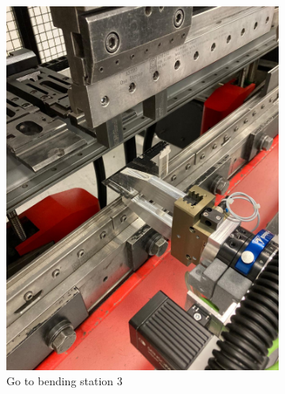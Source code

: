\begin{figure}[h]
    \centering
    \begin{subfigure}[b]{0.32\textwidth}
        \centering
        \includegraphics[width=\textwidth]{figures/bending/bending4-001.png}
        \caption{Go to bending station 3}
        \label{subfig:bending4-before}
    \end{subfigure}\hspace{0.1cm}
    \begin{subfigure}[b]{0.32\textwidth}
        \centering

\end{subfigure}
\end{figure}

